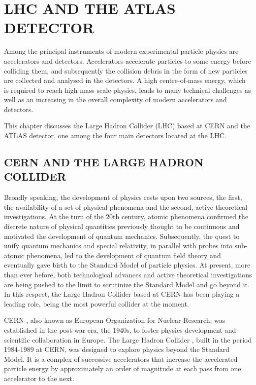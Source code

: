 \chapter{LHC AND THE ATLAS DETECTOR}\label{c:detector}

Among the principal instruments of modern experimental particle physics are
accelerators and detectors. Accelerators accelerate particles to some energy
before colliding them, and subsequently the collision debris in the form of new
particles are collected and analysed in the detectors. A high centre-of-mass
energy, which is required to reach high mass scale physics, leads to many
technical challenges as well as an increasing in the overall complexity of
modern accelerators and detectors.

This chapter discusses the Large Hadron Collider (LHC) based at CERN and the
ATLAS detector, one among the four main detectors located at the LHC.

\section{CERN AND THE LARGE HADRON COLLIDER}


Broadly speaking, the development of physics rests upon two sources, the first,
the availability of a set of physical phenomena and the second, active
theoretical investigations. At the turn of the $20$th century, atomic phenomena
confirmed the discrete nature of physical quantities previously thought to be
continuous and motivated the development of quantum mechanics. Subsequently,
the quest to unify quantum mechanics and special relativity, in parallel with
probes into sub-atomic phenomena, led to the development of quantum field
theory and eventually gave birth to the Standard Model of particle physics. At
present, more than ever before, both technological advances and active
theoretical investigations are being pushed to the limit to scrutinize the
Standard Model and go beyond it. In this respect, the Large Hadron Collider
based at CERN has been playing a leading role, being the most powerful collider
at the moment.

CERN \cite{cernlink}, also known as European Organization for Nuclear Research,
was established in the post-war era, the $1940$s, to foster physics development
and scientific collaboration in Europe. The Large Hadron Collider
\cite{lhclink}, built in the period 1984-1989 at CERN, was designed to explore
physics beyond the Standard Model. It is a complex of successive accelerators
that increase the accelerated particle energy by approximately an order of
magnitude at each pass from one accelerator to the next.


